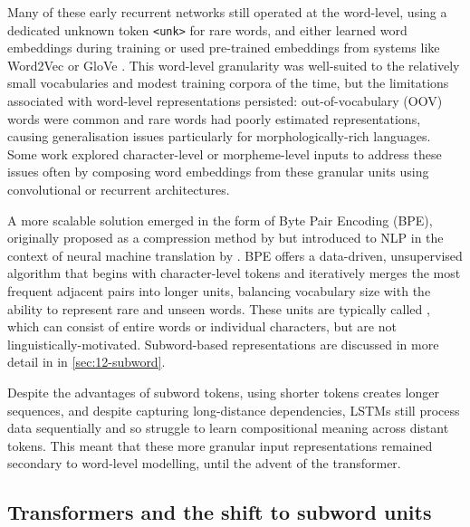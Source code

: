 Many of these early recurrent networks still operated at the word-level, using a dedicated unknown token \texttt{<unk>} for rare words, and either learned word embeddings during training or used pre-trained embeddings from systems like Word2Vec or GloVe \citep{pennington2014glove}. This word-level granularity was well-suited to the relatively small vocabularies and modest training corpora of the time, but the limitations associated with word-level representations persisted: out-of-vocabulary (OOV) words were common and rare words had poorly estimated representations, causing generalisation issues particularly for morphologically-rich languages. Some work explored character-level or morpheme-level inputs to address these issues \citep[e.g.,][]{botha2014compositional, kim2016character, vania2017morphology, gerz2018} often by composing word embeddings from these granular units using convolutional or recurrent architectures.

A more scalable solution emerged in the form of Byte Pair Encoding (BPE), originally proposed as a compression method by \citet{gage1994new} but introduced to NLP in the context of neural machine translation by \citet{sennrich-etal-2016-bpe}. BPE offers a data-driven, unsupervised algorithm that begins with character-level tokens and iteratively merges the most frequent adjacent pairs into longer units, balancing vocabulary size with the ability to represent rare and unseen words. These units are typically called , which can consist of entire words or individual characters, but are not linguistically-motivated. Subword-based representations are discussed in more detail in in \cref{sec:12-subword}.


Despite the advantages of subword tokens, using shorter tokens creates longer sequences, and despite capturing long-distance dependencies, LSTMs still process data sequentially and so struggle to learn compositional meaning across distant tokens. This meant that these more granular input representations remained secondary to word-level modelling, until the advent of the transformer.

\subsection{Transformers and the shift to subword units}

